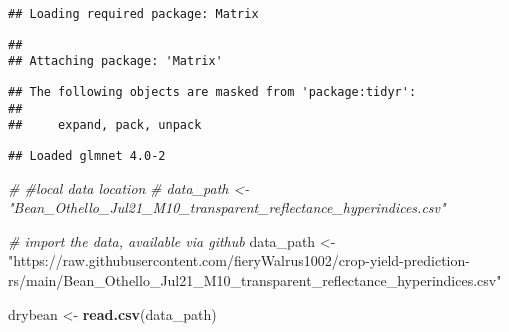 \documentclass[
]{article}
\newenvironment{Shaded}{\begin{snugshade}}{\end{snugshade}}
\newcommand{\CommentTok}[1]{\textcolor[rgb]{0.56,0.35,0.01}{\textit{#1}}}
\newcommand{\KeywordTok}[1]{\textcolor[rgb]{0.13,0.29,0.53}{\textbf{#1}}}
\newcommand{\NormalTok}[1]{#1}
\newcommand{\StringTok}[1]{\textcolor[rgb]{0.31,0.60,0.02}{#1}}
\begin{document}
\begin{verbatim}
## Loading required package: Matrix
\end{verbatim}

\begin{verbatim}
## 
## Attaching package: 'Matrix'
\end{verbatim}

\begin{verbatim}
## The following objects are masked from 'package:tidyr':
## 
##     expand, pack, unpack
\end{verbatim}

\begin{verbatim}
## Loaded glmnet 4.0-2
\end{verbatim}

\begin{Shaded}
\begin{Highlighting}[]
\CommentTok{# #local data location}
\CommentTok{# data_path <- "Bean_Othello_Jul21_M10_transparent_reflectance_hyperindices.csv"}

\CommentTok{# import the data, available via github}
\NormalTok{data_path <-}\StringTok{ "https://raw.githubusercontent.com/fieryWalrus1002/crop-yield-prediction-rs/main/Bean_Othello_Jul21_M10_transparent_reflectance_hyperindices.csv"}


\NormalTok{drybean <-}\StringTok{ }\KeywordTok{read.csv}\NormalTok{(data_path)}
\end{Highlighting}
\end{Shaded}
\end{document}
